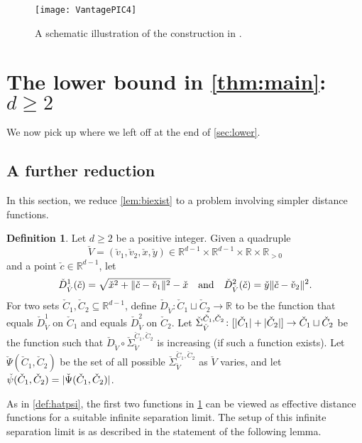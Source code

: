 \documentclass[11pt]{amsart}
\theoremstyle{definition}
\newtheorem{definition}[theorem]{Definition}
\DeclarePairedDelimiter{\abs}{\lvert}{\rvert}
\DeclarePairedDelimiter{\Abs}{\lVert}{\rVert}
\newcommand{\RR}{\mathbb{R}}
\begin{document}
\begin{figure}[tbp]
\begin{center}{\texttt{[image: VantagePIC4]}}
\end{center}
\caption{A schematic illustration of the construction in .} 
\label{fig:section5}
\end{figure}

\section{The lower bound in \texorpdfstring{\cref{thm:main}}{Theorem \ref{thm:main}}: \texorpdfstring{$d \geq 2$}{d ≥ 2}} \label{sec:lowerdg2}
We now pick up where we left off at the end of \cref{sec:lower}.
\subsection{A further reduction}
In this section, we reduce \cref{lem:biexist} to a problem involving simpler distance functions.
\begin{definition}\label{def:check}
Let $d \geq 2$ be a positive integer. Given a quadruple \[\check V = (\check v_1, \check v_2, \check x, \check y) \in \RR^{d-1} \times \RR^{d-1} \times \RR \times \RR_{>0}\] and a point $\check c \in \RR^{d-1}$, let
\[\check D^1_{\check V}(\check c) = \sqrt{\check x^2 + \Abs{\check c - \check v_1}^2} - \check x \quad\text{and}\quad \check D^2_{\check V}(\check c) = \check y\Abs{\check c - \check v_2}^2.\]
For two sets $\check C_1,\check C_2 \subseteq \RR^{d-1}$, define $\check D_{\check V} \colon \check C_1 \sqcup \check C_2 \to \RR$ to be the function that equals $\check D_{\check V}^1$ on $\check C_1$ and equals $\check D_{\check 
V}^2$ on $\check C_2$.  Let $\check \Sigma_{\check V}^{\check C_1,\check C_2} \colon [\abs{\check C_1} + \abs{\check C_2}] \to \check C_1 \sqcup \check C_2$ be the function such that $\check D_{\check V} \circ \check \Sigma_{\check V}^{\check C_1,\check C_2}$ is increasing (if such a function exists). Let $\check \Psi(\check C_1,\check C_2)$ be the set of all possible $\check \Sigma_{\check V}^{\check C_1,\check C_2}$ as $\check V$ varies, and let $\check \psi(\check C_1,\check C_2) = \abs{\check \Psi(\check C_1,\check C_2)}$.
\end{definition}
As in \cref{def:hatpsi}, the first two functions in \cref{def:check} can be viewed as effective distance functions for a suitable infinite separation limit.  The setup of this infinite separation limit is as described in the statement of the following lemma.
\end{document}
